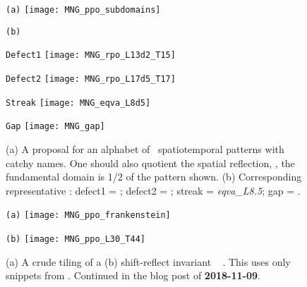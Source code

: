 \begin{description}
\begin{figure}
\begin{minipage}[height=.32\textheight]{.5\textwidth}
\centering \small{\texttt{(a)}}
\texttt{[image: MNG\_ppo\_subdomains]}
\end{minipage}
\begin{minipage}[height=.32\textheight]{.5\textwidth}
\centering \small{\texttt{(b)}}\\
  \begin{minipage}[height=.16\textheight]{.44\textwidth}
    \centering \small{\texttt{Defect1}}
    \texttt{[image: MNG\_rpo\_L13d2\_T15]}
  \end{minipage}
  \begin{minipage}[height=.16\textheight]{.44\textwidth}
    \centering \small{\texttt{Defect2}}
    \texttt{[image: MNG\_rpo\_L17d5\_T17]}
  \end{minipage}
  \begin{minipage}[height=.16\textheight]{.44\textwidth}
    \centering \small{\texttt{Streak}}
    \texttt{[image: MNG\_eqva\_L8d5]}
   \end{minipage}
  \begin{minipage}[height=.16\textheight]{.44\textwidth}
    \centering \small{\texttt{Gap}}
    \texttt{[image: MNG\_gap]}
  \end{minipage}
\end{minipage}
\caption{ \label{fig:MNG_ppo_subdomains}
(a) A proposal for an alphabet of \KS\ spatiotemporal patterns with
catchy names. One should also quotient the spatial reflection, \ie,
the fundamental domain is 1/2 of the pattern shown.
(b) Corresponding representative \twots:
defect1 = ; %
defect2 = ; %
streak = \emph{eqva\_L8.5};
gap = .
}
\end{figure}

\begin{figure}
\begin{minipage}[height=.32\textheight]{.5\textwidth}
\centering \small{\texttt{(a)}}
\texttt{[image: MNG\_ppo\_frankenstein]}
\end{minipage}
\begin{minipage}[height=.32\textheight]{.5\textwidth}
\centering \small{\texttt{(b)}}
\texttt{[image: MNG\_ppo\_L30\_T44]}
\end{minipage}
\caption{ \label{fig:MNG_frankenstein}
(a) A crude tiling of a
(b) shift-reflect invariant \twot\
.
This uses only snippets from .
Continued in the blog post of {\bf 2018-11-09}.
}
\end{figure}



\end{description}
